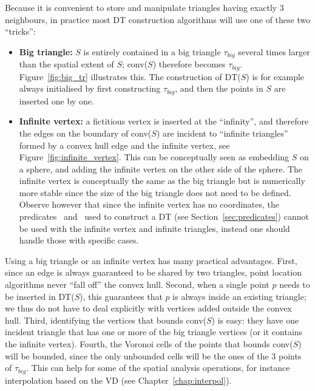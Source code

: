 Because it is convenient to store and manipulate triangles having exactly 3 neighbours, in practice most DT construction algorithms will use one of these two ``tricks'':
\begin{itemize}
  \item \textbf{Big triangle:} $S$ is entirely contained in a big triangle $\tau_{big}$ several times larger than the spatial extent of $S$; conv($S$) therefore becomes $\tau_{big}$. 
  Figure~\ref{fig:big_tr} illustrates this.
  The construction of DT($S$) is for example always initialised by first constructing $\tau_{big}$, and then the points in $S$ are inserted one by one. 
  \item \textbf{Infinite vertex:} a fictitious vertex is inserted at the ``infinity'', and therefore the edges on the boundary of conv($S$) are incident to ``infinite triangles'' formed by a convex hull edge and the infinite vertex, see Figure~\ref{fig:infinite_vertex}.
  This can be conceptually seen as embedding $S$ on a sphere, and adding the infinite vertex on the other side of the sphere.
  The infinite vertex is conceptually the same as the big triangle but is numerically more stable since the size of the big triangle does not need to be defined.
  Observe however that since the infinite vertex has no coordinates, the predicates \Orient\ and \Incircle\ used to construct a DT (see Section~\ref{sec:predicates}) cannot be used with the infinite vertex and infinite triangles, instead one should handle those with specific cases.
\end{itemize}

%

Using a big triangle or an infinite vertex has many practical advantages. 
First, since an edge is always guaranteed to be shared by two triangles, point location algorithms never ``fall off'' the convex hull. 
Second, when a single point $p$ needs to be inserted in DT($S$), this guarantees that $p$ is always inside an existing triangle; we thus do not have to deal explicitly with vertices added outside the convex hull. 
Third, identifying the vertices that bounds conv($S$) is easy: they have one incident triangle that has one or more of the big triangle vertices (or it contains the infinite vertex).
Fourth, the Voronoi cells of the points that bounds conv($S$) will be bounded, since the only unbounded cells will be the ones of the 3 points of $\tau_{big}$. 
This can help for some of the spatial analysis operations, for instance interpolation based on the VD (see Chapter~\ref{chap:interpol}).

